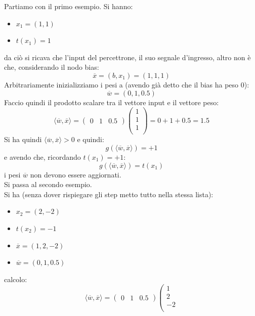 \begin{esercizio}
						Partiamo con il primo esempio. Si hanno:
						\begin{itemize}
							\item $x_1=(1, 1)$
							\item $t(x_1)=1$
						\end{itemize}
						da ciò si ricava che l'input del percettrone, il suo segnale d'ingresso, altro
						non è che, considerando il nodo bias:
						\[\overline{x}=(b, x_1)=(1, 1, 1)\]
						Arbitrariamente inizializziamo i pesi a (avendo già detto che il bias ha peso
						0):
						\[\overline{w}=(0, 1, 0.5)\]
						Faccio quindi il prodotto scalare tra il vettore input e il vettore peso:
						\[\langle \overline{w}, \overline{x}\rangle=
							\left(\begin{matrix}
							0 & 1 & 0.5
							\end{matrix}\right)
							\left(
							\begin{matrix}
								1 \\
								1 \\
								1 \\
							\end{matrix}
							\right)= 0 + 1 + 0.5 = 1.5
						\]
						Si ha quindi $\langle \overline{w}, \overline{x}\rangle > 0$ e quindi:
						\[g(\langle \overline{w}, \overline{x}\rangle)=+1\]
						e avendo che, ricordando $t(x_1)=+1$:
						\[g(\langle \overline{w}, \overline{x}\rangle)=t(x_1)\]
						i pesi $\overline{w}$ non devono essere aggiornati.\\
						Si passa al secondo esempio.\\
						Si ha (senza dover rispiegare gli step metto tutto nella stessa lista):
						\begin{itemize}
							\item $x_2=(2,-2)$
							\item $t(x_2)=-1$
							\item $\overline{x}=(1, 2,-2)$
							\item $\overline{w}=(0, 1, 0.5)$
						\end{itemize}
						calcolo:
						\[\langle \overline{w}, \overline{x}\rangle=
							\left(\begin{matrix}
							0 & 1 & 0.5
							\end{matrix}\right)
							\left(
							\begin{matrix}
								1  \\
								2  \\
								-2 \\
							\end{matrix}
\]
\end{esercizio}
